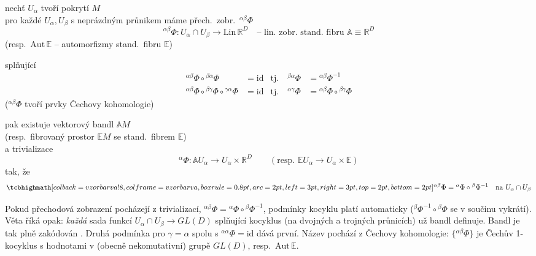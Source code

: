 nechť $U_\alpha$ tvoří pokrytí $M$ \\
pro každé $U_\alpha, U_\beta$ s neprázdným průnikem máme přech.\ zobr.\ ${}^{\alpha\beta}\Phi$
\[
  {}^{\alpha\beta}\Phi: U_\alpha\cap U_\beta\to\mathrm{Lin}\,\mathbb{R}^D
  \quad\text{-- lin.\ zobr.\ stand.\ fibru } \mathbb{A}\equiv\mathbb{R}^D
\]
\hfill (resp.\ $\mathrm{Aut}\,\mathbb{E}$ -- automorfizmy stand.\ fibru $\mathbb{E}$)

splňující 
\begin{align*}
  {}^{\alpha\beta}\Phi\circ{}^{\beta\alpha}\Phi &= \mathrm{id} & \text{tj.}\quad {}^{\beta\alpha}\Phi &= {}^{\alpha\beta}\Phi^{-1} \\
  {}^{\alpha\beta}\Phi\circ{}^{\beta\gamma}\Phi\circ{}^{\gamma\alpha}\Phi &= \mathrm{id} & \text{tj.}\quad {}^{\alpha\gamma}\Phi &= {}^{\alpha\beta}\Phi\circ{}^{\beta\gamma}\Phi
\end{align*}
(${}^{\alpha\beta}\Phi$ tvoří prvky Čechovy kohomologie)

pak existuje vektorový bandl $\mathbb{A}M$ \\
\quad (resp.\ fibrovaný prostor $\mathbb{E}M$ se stand.\ fibrem $\mathbb{E}$) \\
\quad a trivializace
\[
  {}^{\alpha}\Phi: \mathbb{A}U_\alpha\to U_\alpha\times\mathbb{R}^D
  \qquad (\text{resp. } \mathbb{E}U_\alpha\to U_\alpha\times\mathbb{E})
\]
tak, že
\[
  \vzorec{{}^{\alpha\beta}\Phi = {}^{\alpha}\Phi\circ{}^{\beta}\Phi^{-1}} \quad\text{na } U_\alpha\cap U_\beta
\]

\begin{vysvetleni}
Pokud přechodová zobrazení pocházejí z trivializací, ${}^{\alpha\beta}\Phi={}^{\alpha}\Phi\circ{}^{\beta}\Phi^{-1}$, podmínky kocyklu platí automaticky
(${}^{\beta}\Phi^{-1}\circ{}^{\beta}\Phi$ se v součinu vykrátí). Věta říká opak: \emph{každá} sada funkcí $U_\alpha\cap U_\beta\to GL(D)$ splňující
kocyklus (na dvojných a trojných průnicích) už bandl definuje. Bandl je tak plně zakódován .
Druhá podmínka pro $\gamma=\alpha$ spolu s ${}^{\alpha\alpha}\Phi=\mathrm{id}$ dává první.
Název  pochází z Čechovy kohomologie: $\{{}^{\alpha\beta}\Phi\}$ je Čechův 1-kocyklus s hodnotami v (obecně nekomutativní) grupě $GL(D)$, resp.\ $\mathrm{Aut}\,\mathbb{E}$.
\end{vysvetleni}

